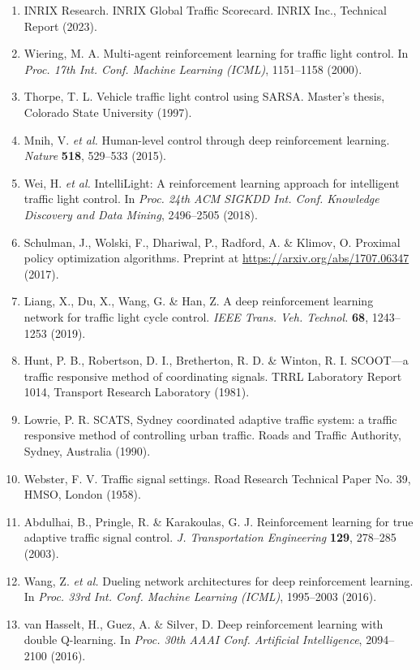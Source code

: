 \documentclass[10pt,a4paper]{article}
\begin{document}
\begin{enumerate}
    \item INRIX Research. INRIX Global Traffic Scorecard. INRIX Inc., Technical Report (2023).
    \item Wiering, M. A. Multi-agent reinforcement learning for traffic light control. In \textit{Proc. 17th Int. Conf. Machine Learning (ICML)}, 1151--1158 (2000).
    \item Thorpe, T. L. Vehicle traffic light control using SARSA. Master's thesis, Colorado State University (1997).
    \item Mnih, V. \textit{et al.} Human-level control through deep reinforcement learning. \textit{Nature} \textbf{518}, 529--533 (2015).
    \item Wei, H. \textit{et al.} IntelliLight: A reinforcement learning approach for intelligent traffic light control. In \textit{Proc. 24th ACM SIGKDD Int. Conf. Knowledge Discovery and Data Mining}, 2496--2505 (2018).
    \item Schulman, J., Wolski, F., Dhariwal, P., Radford, A. \& Klimov, O. Proximal policy optimization algorithms. Preprint at \url{https://arxiv.org/abs/1707.06347} (2017).
    \item Liang, X., Du, X., Wang, G. \& Han, Z. A deep reinforcement learning network for traffic light cycle control. \textit{IEEE Trans. Veh. Technol.} \textbf{68}, 1243--1253 (2019).
    \item Hunt, P. B., Robertson, D. I., Bretherton, R. D. \& Winton, R. I. SCOOT---a traffic responsive method of coordinating signals. TRRL Laboratory Report 1014, Transport Research Laboratory (1981).
    \item Lowrie, P. R. SCATS, Sydney coordinated adaptive traffic system: a traffic responsive method of controlling urban traffic. Roads and Traffic Authority, Sydney, Australia (1990).
    \item Webster, F. V. Traffic signal settings. Road Research Technical Paper No. 39, HMSO, London (1958).
    \item Abdulhai, B., Pringle, R. \& Karakoulas, G. J. Reinforcement learning for true adaptive traffic signal control. \textit{J. Transportation Engineering} \textbf{129}, 278--285 (2003).
    \item Wang, Z. \textit{et al.} Dueling network architectures for deep reinforcement learning. In \textit{Proc. 33rd Int. Conf. Machine Learning (ICML)}, 1995--2003 (2016).
    \item van Hasselt, H., Guez, A. \& Silver, D. Deep reinforcement learning with double Q-learning. In \textit{Proc. 30th AAAI Conf. Artificial Intelligence}, 2094--2100 (2016).

\end{enumerate}
\end{document}
